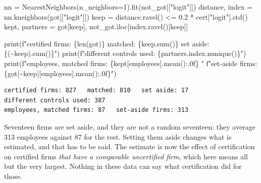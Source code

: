 \documentclass[
  letterpaper,
  10pt,
  twoside,
  openright,
  numbers=noenddot,
  chapterprefix=true]{scrbook}
\newenvironment{Shaded}{}{}
\newcommand{\BuiltInTok}[1]{\textcolor[rgb]{0.84,0.23,0.29}{#1}}
\newcommand{\DecValTok}[1]{\textcolor[rgb]{0.00,0.36,0.77}{#1}}
\newcommand{\FloatTok}[1]{\textcolor[rgb]{0.00,0.36,0.77}{#1}}
\newcommand{\NormalTok}[1]{\textcolor[rgb]{0.14,0.16,0.18}{#1}}
\newcommand{\OperatorTok}[1]{\textcolor[rgb]{0.14,0.16,0.18}{#1}}
\newcommand{\SpecialCharTok}[1]{\textcolor[rgb]{0.00,0.36,0.77}{#1}}
\newcommand{\SpecialStringTok}[1]{\textcolor[rgb]{0.01,0.18,0.38}{#1}}
\newcommand{\StringTok}[1]{\textcolor[rgb]{0.01,0.18,0.38}{#1}}
\begin{document}
\label{check-cert-match}
\begin{Shaded}
\begin{Highlighting}[]
\NormalTok{nn }\OperatorTok{=}\NormalTok{ NearestNeighbors(n\_neighbors}\OperatorTok{=}\DecValTok{1}\NormalTok{).fit(not\_got[[}\StringTok{"logit"}\NormalTok{]])}
\NormalTok{distance, index }\OperatorTok{=}\NormalTok{ nn.kneighbors(got[[}\StringTok{"logit"}\NormalTok{]])}
\NormalTok{keep }\OperatorTok{=}\NormalTok{ distance.ravel() }\OperatorTok{\textless{}=} \FloatTok{0.2} \OperatorTok{*}\NormalTok{ cert[}\StringTok{"logit"}\NormalTok{].std()}
\NormalTok{kept, partners }\OperatorTok{=}\NormalTok{ got[keep], not\_got.iloc[index.ravel()[keep]]}

\BuiltInTok{print}\NormalTok{(}\SpecialStringTok{f"certified firms: }\SpecialCharTok{\{}\BuiltInTok{len}\NormalTok{(got)}\SpecialCharTok{\}}\SpecialStringTok{   matched: }\SpecialCharTok{\{}\NormalTok{keep}\SpecialCharTok{.}\BuiltInTok{sum}\NormalTok{()}\SpecialCharTok{\}}\SpecialStringTok{   set aside: }\SpecialCharTok{\{}\NormalTok{(}\OperatorTok{\textasciitilde{}}\NormalTok{keep)}\SpecialCharTok{.}\BuiltInTok{sum}\NormalTok{()}\SpecialCharTok{\}}\SpecialStringTok{"}\NormalTok{)}
\BuiltInTok{print}\NormalTok{(}\SpecialStringTok{f"different controls used: }\SpecialCharTok{\{}\NormalTok{partners}\SpecialCharTok{.}\NormalTok{index}\SpecialCharTok{.}\NormalTok{nunique()}\SpecialCharTok{\}}\SpecialStringTok{"}\NormalTok{)}
\BuiltInTok{print}\NormalTok{(}\SpecialStringTok{f"employees, matched firms: }\SpecialCharTok{\{}\NormalTok{kept[}\StringTok{\textquotesingle{}employees\textquotesingle{}}\NormalTok{]}\SpecialCharTok{.}\NormalTok{mean()}\SpecialCharTok{:.0f\}}\SpecialStringTok{   "}
      \SpecialStringTok{f"set{-}aside firms: }\SpecialCharTok{\{}\NormalTok{got[}\OperatorTok{\textasciitilde{}}\NormalTok{keep][}\StringTok{\textquotesingle{}employees\textquotesingle{}}\NormalTok{]}\SpecialCharTok{.}\NormalTok{mean()}\SpecialCharTok{:.0f\}}\SpecialStringTok{"}\NormalTok{)}
\end{Highlighting}
\end{Shaded}

\begin{verbatim}
certified firms: 827   matched: 810   set aside: 17
different controls used: 387
employees, matched firms: 87   set-aside firms: 313
\end{verbatim}

Seventeen firms are set aside, and they are not a random seventeen: they
average 313 employees against 87 for the rest. Setting them aside
changes what is estimated, and that has to be said. The estimate is now
the effect of certification on certified firms \emph{that have a
comparable uncertified firm}, which here means all but the very largest.
Nothing in these data can say what certification did for those.
\end{document}
